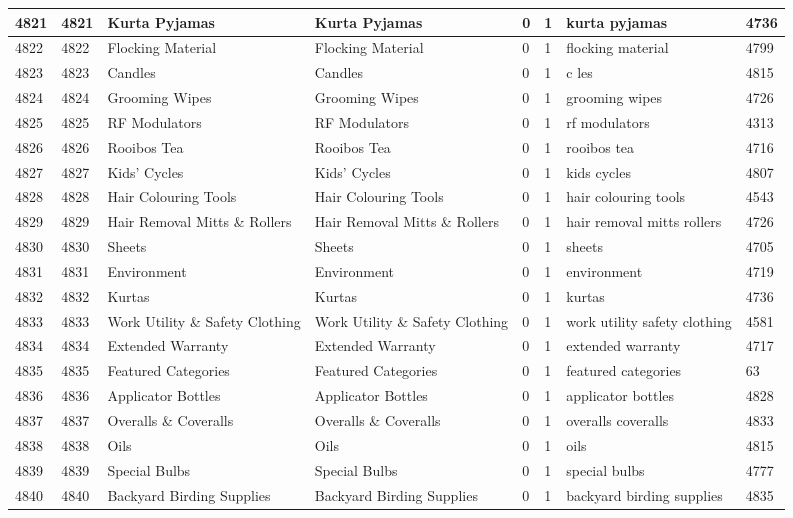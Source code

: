 \begin{longtable}{|l|l|l|l|l|l|l|l|}
4821 & 4821 & Kurta Pyjamas & Kurta Pyjamas & 0 & 1 & kurta pyjamas & 4736 \\ \hline 
4822 & 4822 & Flocking Material & Flocking Material & 0 & 1 & flocking material & 4799 \\ \hline 
4823 & 4823 & Candles & Candles & 0 & 1 & c les & 4815 \\ \hline 
4824 & 4824 & Grooming Wipes & Grooming Wipes & 0 & 1 & grooming wipes & 4726 \\ \hline 
4825 & 4825 & RF Modulators & RF Modulators & 0 & 1 & rf modulators & 4313 \\ \hline 
4826 & 4826 & Rooibos Tea & Rooibos Tea & 0 & 1 & rooibos tea & 4716 \\ \hline 
4827 & 4827 & Kids' Cycles & Kids' Cycles & 0 & 1 & kids cycles & 4807 \\ \hline 
4828 & 4828 & Hair Colouring Tools & Hair Colouring Tools & 0 & 1 & hair colouring tools & 4543 \\ \hline 
4829 & 4829 & Hair Removal Mitts \& Rollers & Hair Removal Mitts \& Rollers & 0 & 1 & hair removal mitts rollers & 4726 \\ \hline 
4830 & 4830 & Sheets & Sheets & 0 & 1 & sheets & 4705 \\ \hline 
4831 & 4831 & Environment & Environment & 0 & 1 & environment & 4719 \\ \hline 
4832 & 4832 & Kurtas & Kurtas & 0 & 1 & kurtas & 4736 \\ \hline 
4833 & 4833 & Work Utility \& Safety Clothing & Work Utility \& Safety Clothing & 0 & 1 & work utility safety clothing & 4581 \\ \hline 
4834 & 4834 & Extended Warranty & Extended Warranty & 0 & 1 & extended warranty & 4717 \\ \hline 
4835 & 4835 & Featured Categories & Featured Categories & 0 & 1 & featured categories & 63 \\ \hline 
4836 & 4836 & Applicator Bottles & Applicator Bottles & 0 & 1 & applicator bottles & 4828 \\ \hline 
4837 & 4837 & Overalls \& Coveralls & Overalls \& Coveralls & 0 & 1 & overalls coveralls & 4833 \\ \hline 
4838 & 4838 & Oils & Oils & 0 & 1 & oils & 4815 \\ \hline 
4839 & 4839 & Special Bulbs & Special Bulbs & 0 & 1 & special bulbs & 4777 \\ \hline 
4840 & 4840 & Backyard Birding Supplies & Backyard Birding Supplies & 0 & 1 & backyard birding supplies & 4835 \\ \hline 

\end{longtable}

